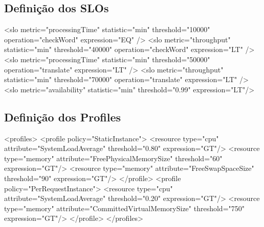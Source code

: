 \subsection{Definição dos SLOs}
\label{subsec:slo}
\small
\begin{verbatimtab}[4]
<slo metric="processingTime" statistic="min" threshold="10000"  
	operation="checkWord" expression="EQ" />
<slo metric="throughput"     statistic="min" threshold="40000"  
	operation="checkWord" expression="LT" />
<slo metric="processingTime" statistic="min" threshold="50000"  
	operation="translate" expression="LT" />
<slo metric="throughput"     statistic="min" threshold="70000" 
	operation="translate" expression="LT" />
<slo metric="availability"   statistic="min" threshold="0.99"   
	expression="LT"/>
\end{verbatimtab}


\subsection{Definição dos Profiles}
\small
\begin{verbatimtab}[4]
<profiles>
	<profile policy="StaticInstance">
		<resource type="cpu" 	attribute="SystemLoadAverage" 
			threshold="0.80" expression="GT"/>
		<resource type="memory" attribute="FreePhysicalMemorySize" 
			threshold="60" expression="GT"/>
		<resource type="memory" attribute="FreeSwapSpaceSize" 
			threshold="90" expression="GT"/>
	</profile>
	<profile policy="PerRequestInstance">
		<resource type="cpu" 	attribute="SystemLoadAverage" 
			threshold="0.20" expression="GT"/>
		<resource type="memory" attribute="CommittedVirtualMemorySize" 
			threshold="750" expression="GT"/>
	</profile>
</profiles>
\end{verbatimtab}
